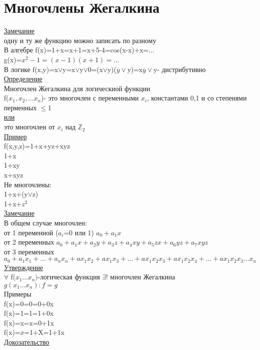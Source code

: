 \documentclass{article}
\begin{document}
\section{Многочлены Жегалкина}
\underline{Замечание}\\
одну и ту же функцию можно записать по разному\\
В алгебре
f(x)=1+x=x+1=x+5-4=cos(x-x)+x=...\\
g(x)=$x^2-1=(x-1)(x+1)=\dots$\\
В логике
f(x,y)=x$\vee$y=x$\vee$y$\vee$0=(x$\vee$y)($\overline{y} \vee $y)=x$\overline{y} \vee$y- дистрибутивно\\
\underline{Определение}\\
Многочлен Жегалкина для логическиой функции\\
f($x_1,x_2,\dots x_n$)- это многочлен с переменными $x_i$, константами 0,1 и со степенями перменных $\leq$1\\
\underline{или}\\
это многочлен от $x_i$ над $\mathbb Z_2$\\
\underline{Пример}\\
f(x,y,z)=1+x+yz+xyz\\
1+x\\
1+xy\\
x+xyz\\
Не многочлены:\\
1+x+(y$\vee$z)\\
1+x+$z^2$\\
\underline{Замечание}\\
В общем случае многочлен:\\
от 1 переменной ($a_i$=0 или 1) $a_0+a_1x$\\
от 2 переменных $a_0+a_1x+a_2y+a_3z+a_4xy+a_5zx+a_6yz+a_7xyz$\\
от 3 переменных $a_0+a_1x_1+\dots+a_nx_n+ax_1x_2+ax_1x_3+\dots+ax_1x_2x_3+ax_1x_2x_4+\dots+ax_1x_2x_3\dots x_n$\\
\underline{Утверждение}\\
$\forall$ f($x_1\dots x_n)$-логическая функция $\exists$! многочлен Жегалкина\\
$g(x_1\dots x_n):f=g$\\
Примеры\\
f(x)=0=0=0+0x\\
f(x)=1=1=1+0x\\
f(x)=x=x=0+1x\\
f(x)=$\overline{x}$=1+X=1+1x\\
\underline{Докозательство}\\
\end{document}
